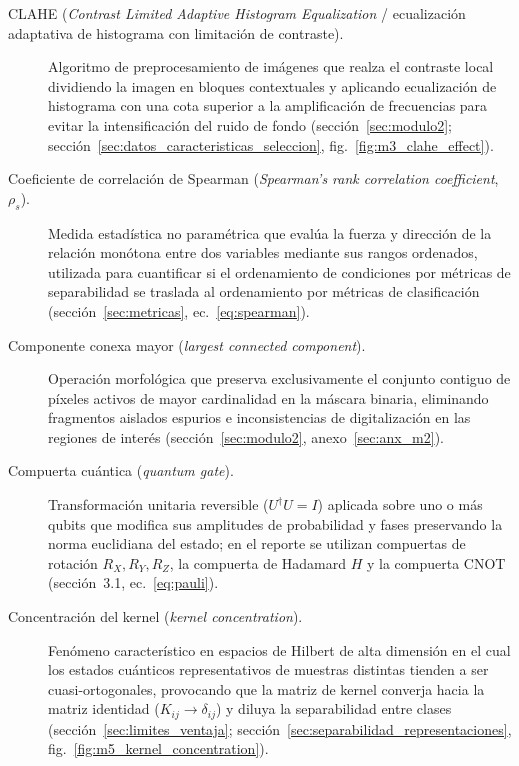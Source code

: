 \begin{description}
  \item[CLAHE (\textit{Contrast Limited Adaptive Histogram Equalization} / ecualización adaptativa de histograma con limitación de contraste).] Algoritmo de preprocesamiento de imágenes que realza el contraste local dividiendo la imagen en bloques contextuales y aplicando ecualización de histograma con una cota superior a la amplificación de frecuencias para evitar la intensificación del ruido de fondo (sección~\ref{sec:modulo2}; sección~\ref{sec:datos_caracteristicas_seleccion}, fig.~\ref{fig:m3_clahe_effect}).

  \item[Coeficiente de correlación de Spearman (\textit{Spearman's rank correlation coefficient}, $\rho_s$).] Medida estadística no paramétrica que evalúa la fuerza y dirección de la relación monótona entre dos variables mediante sus rangos ordenados, utilizada para cuantificar si el ordenamiento de condiciones por métricas de separabilidad se traslada al ordenamiento por métricas de clasificación (sección~\ref{sec:metricas}, ec.~\ref{eq:spearman}).

  \item[Componente conexa mayor (\textit{largest connected component}).] Operación morfológica que preserva exclusivamente el conjunto contiguo de píxeles activos de mayor cardinalidad en la máscara binaria, eliminando fragmentos aislados espurios e inconsistencias de digitalización en las regiones de interés (sección~\ref{sec:modulo2}, anexo~\ref{sec:anx_m2}).

  \item[Compuerta cuántica (\textit{quantum gate}).] Transformación unitaria reversible ($U^\dagger U = I$) aplicada sobre uno o más qubits que modifica sus amplitudes de probabilidad y fases preservando la norma euclidiana del estado; en el reporte se utilizan compuertas de rotación $R_X, R_Y, R_Z$, la compuerta de Hadamard $H$ y la compuerta CNOT (sección~3.1, ec.~\ref{eq:pauli}).

  \item[Concentración del kernel (\textit{kernel concentration}).] Fenómeno característico en espacios de Hilbert de alta dimensión en el cual los estados cuánticos representativos de muestras distintas tienden a ser cuasi-ortogonales, provocando que la matriz de kernel converja hacia la matriz identidad ($K_{ij} \to \delta_{ij}$) y diluya la separabilidad entre clases (sección~\ref{sec:limites_ventaja}; sección~\ref{sec:separabilidad_representaciones}, fig.~\ref{fig:m5_kernel_concentration}).



\end{description}

